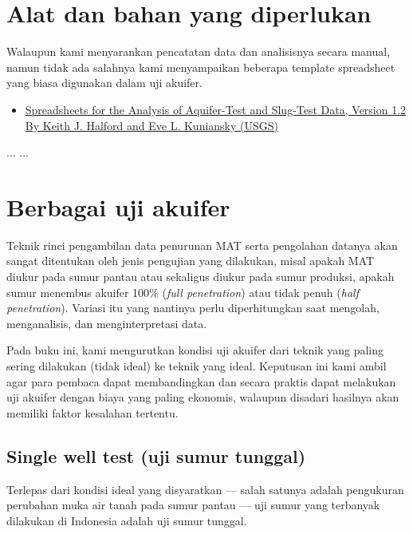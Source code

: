\section{Alat dan bahan yang diperlukan}

Walaupun kami menyarankan pencatatan data dan analisisnya secara manual, namun tidak ada salahnya kami menyampaikan beberapa template spreadsheet yang biasa digunakan dalam uji akuifer.

\begin{itemize}
\item \href{https://pubs.usgs.gov/of/2002/ofr02197/}{Spreadsheets for the Analysis of Aquifer-Test and Slug-Test Data, Version 1.2 By Keith J. Halford and Eve L. Kuniansky (USGS)} 
\end{itemize}

...
...


\section{Berbagai uji akuifer}

Teknik rinci pengambilan data penurunan MAT serta pengolahan datanya akan sangat ditentukan oleh jenis pengujian yang dilakukan, misal apakah MAT diukur pada sumur pantau atau sekaligus diukur pada sumur produksi, apakah sumur menembus akuifer 100\% (\textit{full penetration}) atau tidak penuh (\textit{half penetration}). Variasi itu yang nantinya perlu diperhitungkan saat mengolah, menganalisis, dan menginterpretasi data. 

Pada buku ini, kami mengurutkan kondisi uji akuifer dari teknik yang paling sering dilakukan (tidak ideal) ke teknik yang ideal. Keputusan ini kami ambil agar para pembaca dapat membandingkan dan secara praktis dapat melakukan uji akuifer dengan biaya yang paling ekonomis, walaupun disadari hasilnya akan memiliki faktor kesalahan tertentu.


\subsection{Single well test (uji sumur tunggal)}

Terlepas dari kondisi ideal yang disyaratkan — salah satunya adalah pengukuran perubahan muka air tanah pada sumur pantau — uji sumur yang terbanyak dilakukan di Indonesia adalah uji sumur tunggal.  

